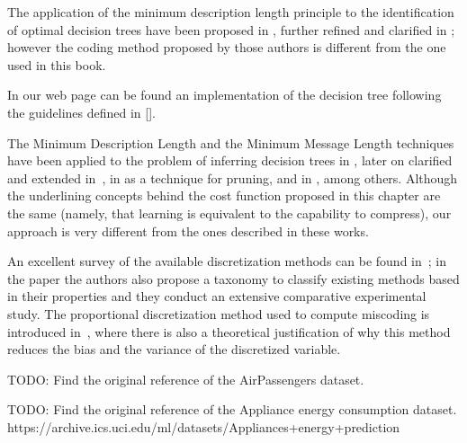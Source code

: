 The application of the minimum description length principle to the identification of optimal decision trees have been proposed in \cite{quinlan1989inferring}, further refined and clarified in \cite{wallace1993coding}; however the coding method proposed by those authors is different from the one used in this book.

In our web page can be found an implementation of the decision tree following the guidelines defined in []. 


The Minimum Description Length \cite{grunwald2007minimum} and the Minimum Message Length \cite{wallace2005statistical} techniques have been applied to the problem of inferring decision trees in \cite{quinlan1989inferring}, later on clarified and extended in~\cite{wallace1993coding}, in \cite{mehta1995mdl} as a technique for pruning, and in \cite{rastogi1998public}, among others. Although the underlining concepts behind the cost function proposed in this chapter are the same (namely, that learning is equivalent to the capability to compress), our approach is very different from the ones described in these works.

An excellent survey of the available discretization methods can be found in~\cite{garcia2013survey}; in the paper the authors also propose a taxonomy to classify existing methods based in their properties and they conduct an extensive comparative experimental study. The proportional discretization method used to compute miscoding is introduced in~\cite{yang2009discretization}, where there is also a theoretical justification of why this method reduces the bias and the variance of the discretized variable.

{\color{red} TODO: Find the original reference of the AirPassengers dataset.}

{\color{red} TODO: Find the original reference of the Appliance energy consumption dataset. https://archive.ics.uci.edu/ml/datasets/Appliances+energy+prediction}



